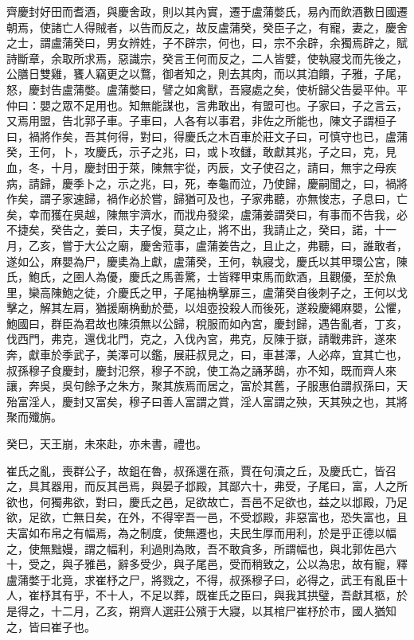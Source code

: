 \begin{pinyinscope}
齊慶封好田而耆酒，與慶舍政，則以其內實，遷于盧蒲嫳氏，易內而飲酒數日國遷朝焉，使諸亡人得賊者，以告而反之，故反盧蒲癸，癸臣子之，有寵，妻之，慶舍之士，謂盧蒲癸曰，男女辨姓，子不辟宗，何也，曰，宗不余辟，余獨焉辟之，賦詩斷章，余取所求焉，惡識宗，癸言王何而反之，二人皆嬖，使執寢戈而先後之，公膳日雙雞，饔人竊更之以鶩，御者知之，則去其肉，而以其洎饋，子雅，子尾，怒，慶封告盧蒲嫳。盧蒲嫳曰，譬之如禽獸，吾寢處之矣，使析歸父告晏平仲。平仲曰：嬰之眾不足用也。知無能謀也，言弗敢出，有盟可也。子家曰，子之言云，又焉用盟，告北郭子車。子車曰，人各有以事君，非佐之所能也，陳文子謂桓子曰，禍將作矣，吾其何得，對曰，得慶氏之木百車於莊文子曰，可慎守也已，盧蒲癸，王何，卜，攻慶氏，示子之兆，曰，或卜攻讎，敢獻其兆，子之曰，克，見血，冬，十月，慶封田于萊，陳無宇從，丙辰，文子使召之，請曰，無宇之母疾病，請歸，慶季卜之，示之兆，曰，死，奉龜而泣，乃使歸，慶嗣聞之，曰，禍將作矣，謂子家速歸，禍作必於嘗，歸猶可及也，子家弗聽，亦無悛志，子息曰，亡矣，幸而獲在吳越，陳無宇濟水，而戕舟發梁，盧蒲姜謂癸曰，有事而不告我，必不捷矣，癸告之，姜曰，夫子愎，莫之止，將不出，我請止之，癸曰，諾，十一月，乙亥，嘗于大公之廟，慶舍蒞事，盧蒲姜告之，且止之，弗聽，曰，誰敢者，遂如公，麻嬰為尸，慶奊為上獻，盧蒲癸，王何，執寢戈，慶氏以其甲環公宮，陳氏，鮑氏，之圉人為優，慶氏之馬善驚，士皆釋甲束馬而飲酒，且觀優，至於魚里，欒高陳鮑之徒，介慶氏之甲，子尾抽桷擊扉三，盧蒲癸自後刺子之，王何以戈擊之，解其左肩，猶援廟桷動於甍，以俎壺投殺人而後死，遂殺慶繩麻嬰，公懼，鮑國曰，群臣為君故也陳須無以公歸，稅服而如內宮，慶封歸，遇告亂者，丁亥，伐西門，弗克，還伐北門，克之，入伐內宮，弗克，反陳于嶽，請戰弗許，遂來奔，獻車於季武子，美澤可以鑑，展莊叔見之，曰，車甚澤，人必瘁，宜其亡也，叔孫穆子食慶封，慶封氾祭，穆子不說，使工為之誦茅鴟，亦不知，既而齊人來讓，奔吳，吳句餘予之朱方，聚其族焉而居之，富於其舊，子服惠伯謂叔孫曰，天殆富淫人，慶封又富矣，穆子曰善人富謂之賞，淫人富謂之殃，天其殃之也，其將聚而殲旃。

癸巳，天王崩，未來赴，亦未書，禮也。

崔氏之亂，喪群公子，故鉏在魯，叔孫還在燕，賈在句瀆之丘，及慶氏亡，皆召之，具其器用，而反其邑焉，與晏子邶殿，其鄙六十，弗受，子尾曰，富，人之所欲也，何獨弗欲，對曰，慶氏之邑，足欲故亡，吾邑不足欲也，益之以邶殿，乃足欲，足欲，亡無日矣，在外，不得宰吾一邑，不受邶殿，非惡富也，恐失富也，且夫富如布帛之有幅焉，為之制度，使無遷也，夫民生厚而用利，於是乎正德以幅之，使無黜嫚，謂之幅利，利過則為敗，吾不敢貪多，所謂幅也，與北郭佐邑六十，受之，與子雅邑，辭多受少，與子尾邑，受而稍致之，公以為忠，故有寵，釋盧蒲嫳于北竟，求崔杼之尸，將戮之，不得，叔孫穆子曰，必得之，武王有亂臣十人，崔杼其有乎，不十人，不足以葬，既崔氏之臣曰，與我其拱璧，吾獻其柩，於是得之，十二月，乙亥，朔齊人選莊公殯于大寢，以其棺尸崔杼於市，國人猶知之，皆曰崔子也。


\end{pinyinscope}
